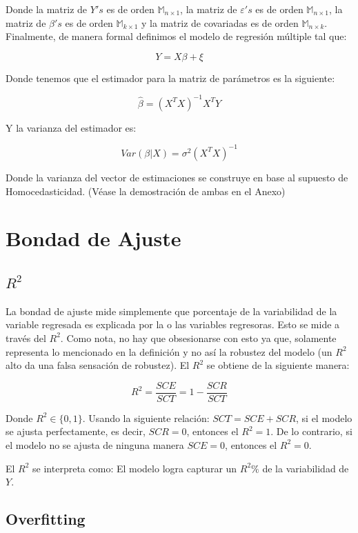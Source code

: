 \documentclass[
]{book}
\begin{document}
Donde la matriz de \(Y's\) es de orden \(\mathbb{M}_{n\times 1}\), la matriz de \(\varepsilon's\) es de orden \(\mathbb{M}_{n\times 1}\), la matriz de \(\beta's\) es de orden \(\mathbb{M}_{k\times 1}\) y la matriz de covariadas es de orden \(\mathbb{M}_{n\times k}\). Finalmente, de manera formal definimos el modelo de regresión múltiple tal que:

\[
Y = X\beta + \xi
\]

Donde tenemos que el estimador para la matriz de parámetros es la siguiente:

\[\hat{\beta} = (X^TX)^{-1}X^TY\]

Y la varianza del estimador es:

\[Var(\beta|X) = \sigma^2(X^TX)^{-1}\]

Donde la varianza del vector de estimaciones se construye en base al supuesto de Homocedasticidad. (Véase la demostración de ambas en el Anexo)

\section{Bondad de Ajuste}\label{bondad-de-ajuste}

\subsection{\texorpdfstring{\(R^2\)}{R\^{}2}}\label{r2}

La bondad de ajuste mide simplemente que porcentaje de la variabilidad de la variable regresada es explicada por la o las variables regresoras. Esto se mide a través del \(R^2\). Como nota, no hay que obsesionarse con esto ya que, solamente representa lo mencionado en la definición y no así la robustez del modelo (un \(R^2\) alto da una falsa sensación de robustez). El \(R^2\) se obtiene de la siguiente manera:

\[
R^2 = \frac{SCE}{SCT} = 1- \frac{SCR}{SCT}
\]

Donde \(R^2 \in \{0,1\}\). Usando la siguiente relación: \(SCT = SCE + SCR\), si el modelo se ajusta perfectamente, es decir, \(SCR = 0\), entonces el \(R^2 = 1\). De lo contrario, si el modelo no se ajusta de ninguna manera \(SCE = 0\), entonces el \(R^2 = 0\).

El \(R^2\) se interpreta como: El modelo logra capturar un \(R^2\%\) de la variabilidad de \(Y\).

\subsection{Overfitting}\label{overfitting}
\end{document}
